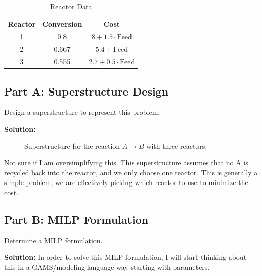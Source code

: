 \documentclass[11pt]{article}
\begin{document}
\begin{table}[htbp]
\centering
\begin{tabular}{|c|c|c|}
\hline
\textbf{Reactor} & \textbf{Conversion} & \textbf{Cost} \\ \hline
1 & 0.8 & \( 8 + 1.5 \cdot \text{Feed} \) \\ \hline
2 & 0.667 & \( 5.4 + \text{Feed} \) \\ \hline
3 & 0.555 & \( 2.7 + 0.5 \cdot \text{Feed} \) \\ \hline
\end{tabular}
\caption{Reactor Data}
\label{tab:reactor_data}
\end{table}

\subsection{Part A: Superstructure Design}
Design a superstructure to represent this problem.

\textbf{Solution:}
\begin{figure}[htbp]
\centering
{}
\caption{Superstructure for the reaction \( A \rightarrow B \) with three reactors.}
\label{fig:superstructure_reactors}
\end{figure}
Not sure if I am oversimplifying this.
This superstructure assumes that no A is recycled back into the reactor, and we only choose one reactor.
This is generally a simple problem, we are effectively picking which reactor to use to minimize the cost.

\subsection{Part B: MILP Formulation}
Determine a MILP formulation.

\textbf{Solution:}
In order to solve this MILP formulation, I will start thinking about this in a GAMS/modeling language way starting with parameters.
\end{document}
